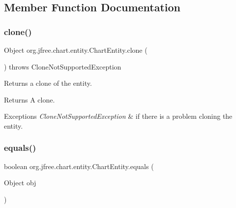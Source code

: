 \subsection{Member Function Documentation}
\mbox{\label{classorg_1_1jfree_1_1chart_1_1entity_1_1_chart_entity_a2c4564d483fe3d847a84cb6119e8c4fa}} 
\subsubsection{\texorpdfstring{clone()}{clone()}}
{\footnotesize\ttfamily Object org.\+jfree.\+chart.\+entity.\+Chart\+Entity.\+clone (\begin{DoxyParamCaption}{ }\end{DoxyParamCaption}) throws Clone\+Not\+Supported\+Exception}

Returns a clone of the entity.

\begin{DoxyReturn}{Returns}
A clone.
\end{DoxyReturn}

\begin{DoxyExceptions}{Exceptions}
{\em Clone\+Not\+Supported\+Exception} & if there is a problem cloning the entity. \\
\hline
\end{DoxyExceptions}
\mbox{\label{classorg_1_1jfree_1_1chart_1_1entity_1_1_chart_entity_a7457c5c69156940e82acfcffae0d87d4}} 
\subsubsection{\texorpdfstring{equals()}{equals()}}
{\footnotesize\ttfamily boolean org.\+jfree.\+chart.\+entity.\+Chart\+Entity.\+equals (\begin{DoxyParamCaption}\item[{Object}]{obj }\end{DoxyParamCaption})}

